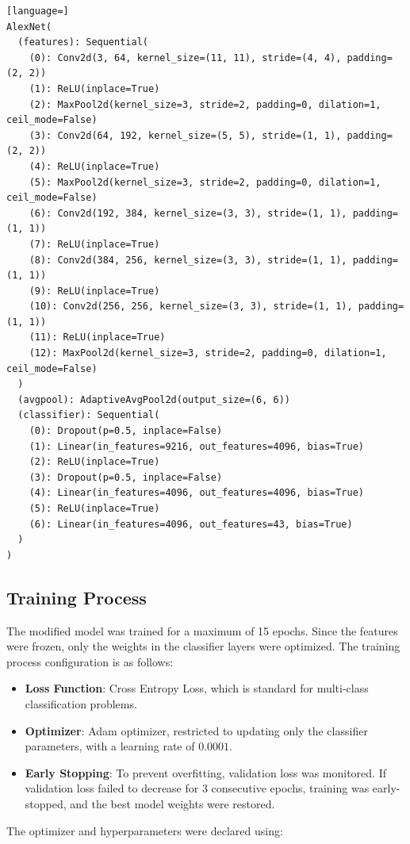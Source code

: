 \documentclass[conference]{IEEEtran}
\begin{document}
\begin{lstlisting}[language=]
AlexNet(
  (features): Sequential(
    (0): Conv2d(3, 64, kernel_size=(11, 11), stride=(4, 4), padding=(2, 2))
    (1): ReLU(inplace=True)
    (2): MaxPool2d(kernel_size=3, stride=2, padding=0, dilation=1, ceil_mode=False)
    (3): Conv2d(64, 192, kernel_size=(5, 5), stride=(1, 1), padding=(2, 2))
    (4): ReLU(inplace=True)
    (5): MaxPool2d(kernel_size=3, stride=2, padding=0, dilation=1, ceil_mode=False)
    (6): Conv2d(192, 384, kernel_size=(3, 3), stride=(1, 1), padding=(1, 1))
    (7): ReLU(inplace=True)
    (8): Conv2d(384, 256, kernel_size=(3, 3), stride=(1, 1), padding=(1, 1))
    (9): ReLU(inplace=True)
    (10): Conv2d(256, 256, kernel_size=(3, 3), stride=(1, 1), padding=(1, 1))
    (11): ReLU(inplace=True)
    (12): MaxPool2d(kernel_size=3, stride=2, padding=0, dilation=1, ceil_mode=False)
  )
  (avgpool): AdaptiveAvgPool2d(output_size=(6, 6))
  (classifier): Sequential(
    (0): Dropout(p=0.5, inplace=False)
    (1): Linear(in_features=9216, out_features=4096, bias=True)
    (2): ReLU(inplace=True)
    (3): Dropout(p=0.5, inplace=False)
    (4): Linear(in_features=4096, out_features=4096, bias=True)
    (5): ReLU(inplace=True)
    (6): Linear(in_features=4096, out_features=43, bias=True)
  )
)
\end{lstlisting}

\subsection{Training Process}
The modified model was trained for a maximum of 15 epochs. Since the features were frozen, only the weights in the classifier layers were optimized. The training process configuration is as follows:
\begin{itemize}
    \item \textbf{Loss Function}: Cross Entropy Loss, which is standard for multi-class classification problems.
    \item \textbf{Optimizer}: Adam optimizer, restricted to updating only the classifier parameters, with a learning rate of $0.0001$.
    \item \textbf{Early Stopping}: To prevent overfitting, validation loss was monitored. If validation loss failed to decrease for 3 consecutive epochs, training was early-stopped, and the best model weights were restored.
\end{itemize}

The optimizer and hyperparameters were declared using:
\end{document}
